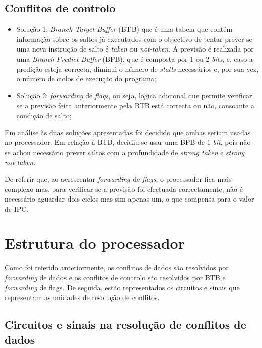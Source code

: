 \documentclass[11pt]{article}
\numberwithin{equation}{section}
\begin{document}
\subsection{Conflitos de controlo}

\begin{itemize}
	\item Solução 1: \textit{Branch Target Buffer} (BTB) que é uma tabela que contém informação sobre os saltos já executados com o objectivo de tentar prever se uma nova instrução de salto é \textit{taken} ou \textit{not-taken}. A previsão é realizada por uma \textit{Branch Predict Buffer} (BPB), que é composta por 1 ou 2 \textit{bits}, e, caso a predição esteja correcta, diminui o número de \textit{stalls} necessários e, por sua vez, o número de ciclos de execução do programa;
	\vspace{-2.5mm}
	\item Solução 2: \textit{forwarding} de \textit{flags}, ou seja, lógica adicional que permite verificar se a previsão feita anteriormente pela BTB está correcta ou não, consoante a condição de salto;
	\vspace{-2.5mm}
\end{itemize}

Em análise às duas soluções apresentadas foi decidido que ambas seriam usadas no processador. Em relação à BTB, decidiu-se usar uma BPB de 1 \textit{bit}, pois não se achou necessário prever saltos com a profundidade de \textit{strong taken} e \textit{strong not-taken}.

De referir que, ao acrescentar \textit{forwarding} de \textit{flags}, o processador fica mais complexo mas, para verificar se a previsão foi efectuada correctamente, não é necessário aguardar dois ciclos mas sim apenas um, o que compensa para o valor de IPC.

\section{Estrutura do processador}

Como foi referido anteriormente, os conflitos de dados são resolvidos por \textit{forwarding} de dados e os conflitos de controlo são resolvidos por BTB e \textit{forwarding} de flags. De seguida, estão representados os circuitos e sinais que representam as unidades de resolução de conflitos.

\subsection{Circuitos e sinais na resolução de conflitos de dados}
\end{document}

